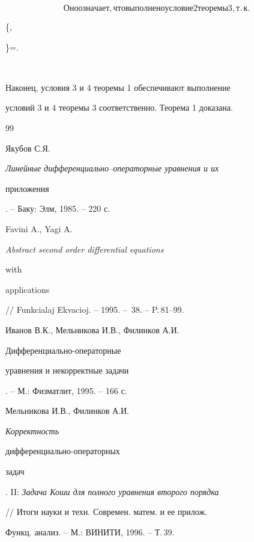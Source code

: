 $$ 


Оно означает, что выполнено условие 2 теоремы 3, т.\,к. 


$$ 


\min\bigg\{,\; 


\bigg\}=\varkappa. 


$$ 


 


Наконец, условия 3 и 4 теоремы 1 обеспечивают выполнение  


условий 3 и 4 теоремы 3 соответственно. Теорема 1 доказана. 


 


\begin{thebibliography}{99}  


  




Якубов С.Я. {\em Линейные дифференциально--операторные уравнения и их  


приложения}. -- Баку: Элм, 1985. -- 220 с. 




Favini A., Yagi A. {\em Abstract second order differential equations 


with  


applications} // Funkcialaj Ekvacioj. -- 1995. -- \No\,38. -- P.\,81--99. 




Иванов В.К., Мельникова И.В., Филинков А.И. {\em 


Дифференциально-операторные  


уравнения и некорректные задачи}. -- М.: Физматлит, 1995. -- 166 с. 




Мельникова И.В., Филинков А.И. {\em Корректность 


дифференциально-операторных 


задач}. II: {\em Задача Коши для полного уравнения второго порядка} 


// Итоги науки и техн. Современ. матем. и ее прилож. 


Функц. анализ. -- М.: ВИНИТИ, 1996. -- Т.\,39. 







\end{thebibliography}
